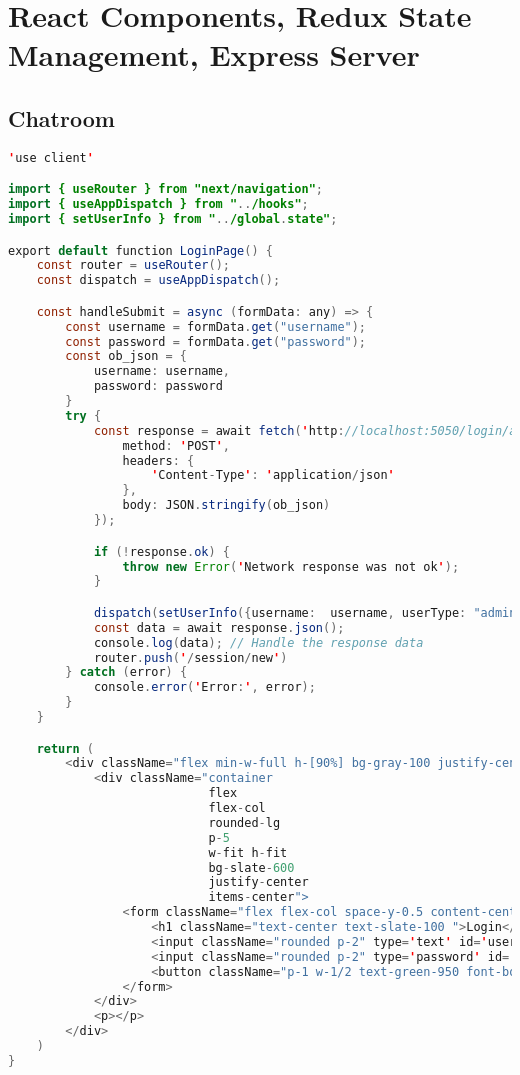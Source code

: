 \chapter{React Components, Redux State Management, Express Server}
\label{appendix:B}

\section{Chatroom}

\begin{lstlisting}[language=Java, caption={Login Page}, label={lst:java}]
'use client'

import { useRouter } from "next/navigation";
import { useAppDispatch } from "../hooks";
import { setUserInfo } from "../global.state";

export default function LoginPage() {
    const router = useRouter();
    const dispatch = useAppDispatch();

    const handleSubmit = async (formData: any) => {
        const username = formData.get("username");
        const password = formData.get("password");
        const ob_json = {
            username: username,
            password: password
        }
        try {
            const response = await fetch('http://localhost:5050/login/admin', {
                method: 'POST',
                headers: {
                    'Content-Type': 'application/json'
                },
                body: JSON.stringify(ob_json)
            });

            if (!response.ok) {
                throw new Error('Network response was not ok');
            }

            dispatch(setUserInfo({username:  username, userType: "admin", isLoggedIn: true}));
            const data = await response.json();
            console.log(data); // Handle the response data
            router.push('/session/new') 
        } catch (error) {
            console.error('Error:', error);
        }
    }

    return (
        <div className="flex min-w-full h-[90%] bg-gray-100 justify-center items-center content-center">
            <div className="container 
                            flex 
                            flex-col 
                            rounded-lg
                            p-5 
                            w-fit h-fit 
                            bg-slate-600
                            justify-center 
                            items-center">
                <form className="flex flex-col space-y-0.5 content-center items-center" action={handleSubmit}>
                    <h1 className="text-center text-slate-100 ">Login</h1>
                    <input className="rounded p-2" type='text' id='username' placeholder="username" name='username' required/><br />
                    <input className="rounded p-2" type='password' id='password' placeholder="password" name='password' required/><br />
                    <button className="p-1 w-1/2 text-green-950 font-bold bg-green-400 rounded place-self-center" type="submit">Submit</button>
                </form>
            </div>
            <p></p>
        </div>
    )
}
\end{lstlisting}
